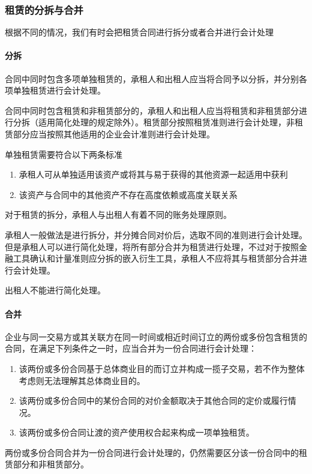 \documentclass[UTF8,12pt]{ctexart}
\numberwithin{equation}{section} %
\numberwithin{figure}{section}
\numberwithin{table}{section}
\begin{document}
	\subsubsection{租赁的分拆与合并}
	根据不同的情况，我们有时会把租赁合同进行拆分或者合并进行会计处理
	\paragraph{分拆}
	合同中同时包含多项单独租赁的，承租人和出租人应当将合同予以分拆，并分别各项单独租赁进行会计处理。
	
	合同中同时包含租赁和非租赁部分的，承租人和出租人应当将租赁和非租赁部分进行分拆（适用简化处理的规定除外）。租赁部分按照租赁准则进行会计处理，非租赁部分应当按照其他适用的企业会计准则进行会计处理。
	
	单独租赁需要符合以下两条标准
	\begin{enumerate}
		\item 承租人可从单独适用该资产或将其与易于获得的其他资源一起适用中获利
		
		\item 该资产与合同中的其他资产不存在高度依赖或高度关联关系
	\end{enumerate}
	
	对于租赁的拆分，承租人与出租人有着不同的账务处理原则。
	
	承租人一般做法是进行拆分，并分摊合同对价后，选取不同的准则进行会计处理。但是承租人可以进行简化处理，将所有部分合并为租赁进行处理，不过对于按照金融工具确认和计量准则应分拆的嵌入衍生工具，承租人不应将其与租赁部分合并进行会计处理。
	
	出租人不能进行简化处理。
	
	
	\paragraph{合并}
	
	企业与同一交易方或其关联方在同一时间或相近时间订立的两份或多份包含租赁的合同，在满足下列条件之一时，应当合并为一份合同进行会计处理：
	\begin{enumerate}
		\item 该两份或多份合同基于总体商业目的而订立并构成一揽子交易，若不作为整体考虑则无法理解其总体商业目的。
		\item 该两份或多份合同中的某份合同的对价金额取决于其他合同的定价或履行情况。
		\item 该两份或多份合同让渡的资产使用权合起来构成一项单独租赁。
	\end{enumerate}	
	两份或多份合同合并为一份合同进行会计处理的，仍然需要区分该一份合同中的租赁部分和非租赁部分。
	
\end{document}
